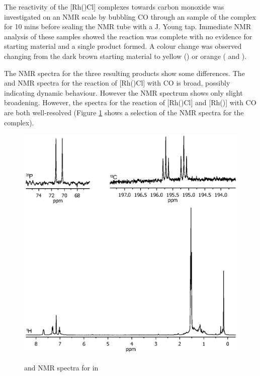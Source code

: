 The reactivity of the [Rh(\tBuxantphosk)Cl] complexes towards carbon monoxide was investigated on an NMR scale by bubbling CO through an sample of the complex for 10 mins before sealing the NMR tube with a J. Young tap.  Immediate NMR analysis of these samples showed the reaction was complete with no evidence for starting material and a single product formed.  A colour change was observed changing from the dark brown starting material to yellow (\tBusixantphos) or orange (\tButhixantphos{} and \tBuxantphos).

The NMR spectra for the three resulting products show some differences.  The \proton{} and \carbon{} NMR spectra for the reaction of [Rh(\tButhixantphosk)Cl] with CO is broad, possibly indicating dynamic behaviour.  However the \phosphorus{} NMR spectrum shows only slight broadening.  However, the spectra for the reaction of [Rh(\tBusixantphosk)Cl] and [Rh(\tBuxantphosk)] with CO are both well-resolved (Figure \ref{Rhcarbonylnmr} shows a selection of the NMR spectra for the \tBuxantphos{} complex).

\begin{figure}[htbp]
\begin{center}
\vspace{0.5cm}
\includegraphics[trim = 2.5cm 7.2cm 2.5cm 5.0cm, clip]{../NMR/7017.eps}
\caption[\phosphorus{} and \proton{} NMR spectra for [Rh(\tBuxantphos)Cl{]}(CO)2]{\phosphorus{} and \proton{} NMR spectra for \ce{[Rh(\tBuxantphos)Cl(CO)2]} in }
\vspace{0.2cm}
\label{Rhcarbonylnmr}
\end{center}
\end{figure}
\vspace{0.2cm}

